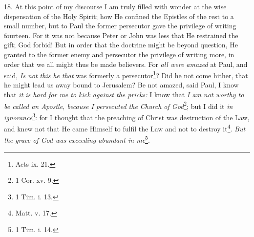 18. At this point of my discourse I am truly filled with wonder at the wise dispensation of the Holy Spirit; how He confined the Epistles of the rest to a small number, but to Paul the former persecutor gave the privilege of writing fourteen. For it was not because Peter or John was less that He restrained the gift; God forbid! But in order that the doctrine might be beyond question, He granted to the former enemy and persecutor the privilege of writing more, in order that we all might thus be made believers. For \emph{all were amazed} at Paul, and said, \emph{Is not this he that} was formerly a persecutor\footnote{Acts ix. 21.}? Did he not come hither, that he might lead us away bound to Jerusalem? Be not amazed, said Paul, I know that \emph{it is hard for me to kick against the pricks:} I know that \emph{I am not worthy to be called an Apostle, because I persecuted the Church of God}\footnote{1 Cor. xv. 9.}; but I did it \emph{in ignorance}\footnote{1 Tim. i. 13.}: for I thought that the preaching of Christ was destruction of the Law, and knew not that He came Himself to fulfil the Law and not to destroy it\footnote{Matt. v. 17.}. \emph{But the grace of God was exceeding abundant in me}\footnote{1 Tim. i. 14.}.

